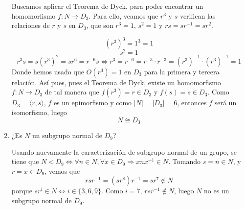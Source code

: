 \documentclass[12pt]{article}
\begin{document}
\begin{ejercicio}
\begin{enumerate}[label=(\alph*)]
            Buscamos aplicar el Teorema de Dyck, para poder encontrar un homomorfismo $f : N \to D_3$. Para ello, veamos que $r^3$ y $s$ verifican las relaciones de $r$ y $s$ en $D_3$, que son $r^3 = 1$, $s^2 = 1$ y $rs = sr^{-1} = sr^2$.

            $$(r^3)^3 = 1^3 = 1$$
            $$s^2 = 1$$
            $$r^3s = s(r^3)^2 = sr^6 = r^{-6}s \iff r^3 = r^{-6} = r^{-3} \cdot r^{-3} = (r^{3})^{-1} \cdot (r^{3})^{-1} = 1$$
            Donde hemos usado que $O(r^3) = 1$ en $D_3$ para la primera y tercera relación. Así pues, pues el Teorema de Dyck, existe un homomorfismo $f : N \to D_3$ de tal manera que $f(r^3) = r \in D_3$ y $f(s) = s \in D_3$. Como $D_3 = \langle r,s \rangle$, $f$ es un epimorfismo y como
            $|N| = |D_3| = 6$, entonces $f$ será un isomorfismo, luego $$N \cong D_3$$

            \item ¿Es $N$ un subgrupo normal de $D_9$?
            
            Usando nuevamente la caracterización de subgrupo normal de un grupo, se tiene que $N \vartriangleleft D_9 \iff \forall n \in N, \forall x \in D_9 \Longrightarrow xnx^{-1} \in N$. Tomando $s = n \in N$, y $r = x \in D_9$, vemos que
            $$rsr^{-1} = (sr^{8})r^{-1} = sr^{7} \notin N$$
            porque $sr^i \in N \iff i \in \{3,6,9\}$. Como $i=7$, $rsr^{-1} \notin N$, luego $N$ no es un subgrupo normal de $D_9$.
        \end{enumerate}
    \end{ejercicio}

    \newpage
\end{document}
